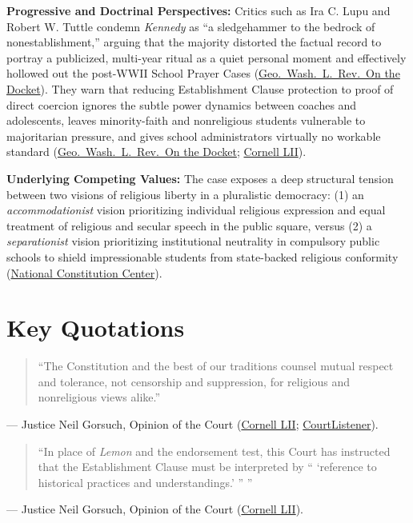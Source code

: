 \documentclass[12pt]{article}
\begin{document}
\textbf{Progressive and Doctrinal Perspectives:} Critics such as Ira C. Lupu and Robert W. Tuttle condemn \textit{Kennedy} as ``a sledgehammer to the bedrock of nonestablishment,'' arguing that the majority distorted the factual record to portray a publicized, multi-year ritual as a quiet personal moment and effectively hollowed out the post-WWII School Prayer Cases (\href{https://www.gwlr.org/kennedy-v-bremerton-school-district-a-sledgehammer-to-the-bedrock-of-nonestablishment/}{Geo.\ Wash.\ L.\ Rev.\ On the Docket}). They warn that reducing Establishment Clause protection to proof of direct coercion ignores the subtle power dynamics between coaches and adolescents, leaves minority-faith and nonreligious students vulnerable to majoritarian pressure, and gives school administrators virtually no workable standard (\href{https://www.gwlr.org/kennedy-v-bremerton-school-district-a-sledgehammer-to-the-bedrock-of-nonestablishment/}{Geo.\ Wash.\ L.\ Rev.\ On the Docket}; \href{https://www.law.cornell.edu/supremecourt/text/21-418}{Cornell LII}).

\textbf{Underlying Competing Values:} The case exposes a deep structural tension between two visions of religious liberty in a pluralistic democracy: (1) an \textit{accommodationist} vision prioritizing individual religious expression and equal treatment of religious and secular speech in the public square, versus (2) a \textit{separationist} vision prioritizing institutional neutrality in compulsory public schools to shield impressionable students from state-backed religious conformity (\href{https://constitutioncenter.org/the-constitution/supreme-court-case-library/kennedy-v-bremerton-school-district}{National Constitution Center}).

\section{Key Quotations}
\begin{quote}
``The Constitution and the best of our traditions counsel mutual respect and tolerance, not censorship and suppression, for religious and nonreligious views alike.''
\end{quote}
\noindent --- Justice Neil Gorsuch, Opinion of the Court (\href{https://www.law.cornell.edu/supremecourt/text/21-418}{Cornell LII}; \href{https://www.courtlistener.com/opinion/6619004/kennedy-v-bremerton-school-dist/}{CourtListener}).

\begin{quote}
``In place of \textit{Lemon} and the endorsement test, this Court has instructed that the Establishment Clause must be interpreted by `` `reference to historical practices and understandings.' '' ''
\end{quote}
\noindent --- Justice Neil Gorsuch, Opinion of the Court (\href{https://www.law.cornell.edu/supremecourt/text/21-418}{Cornell LII}).
\end{document}

